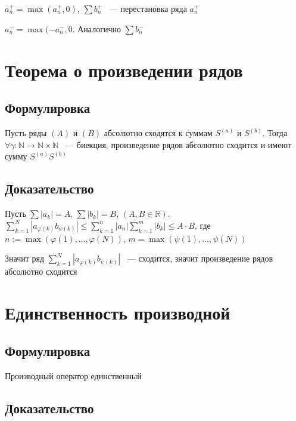 \documentclass{article}
\begin{document}
            $a^+_n = \max(a^+_n, 0)$, $\sum b^+_n$ ~--- перестановка ряда $a^+_n$
            
            $a^-_n = \max(-a^-_n, 0$. Аналогично $\sum b^-_n$
            
    \newpage
    
    \section{Теорема о произведении рядов}
    
        \subsection{Формулировка}
        
            Пусть ряды $(A)$ и $(B)$ абсолютно сходятся к суммам $S^{(a)}$ и $S^{(b)}$. Тогда $\forall \gamma : \mathbb{N} \rightarrow \mathbb{N} \times \mathbb{N}$ ~--- биекция, произведение рядов абсолютно сходится и имеют сумму $S^{(a)} S^{(b)}$
            
        \subsection{Доказательство}
        
            Пусть $\sum |a_k| = A$, $\sum |b_k| = B$, $(A, B \in \mathbb{R})$. $\sum\limits^N_{k = 1} |a_{\varphi(k)} b_{\psi(k)}| \leq \sum\limits^n_{k = 1} |a_n| \sum\limits^m_{k = 1} |b_k| \leq A \cdot B$, где $n := \max(\varphi(1), \ldots, \varphi(N))$, $m = \max(\psi(1), \ldots, \psi(N))$
            
            Значит ряд $\sum\limits^N_{k = 1} |a_{\varphi(k)} b_{\psi(k)}|$ ~--- сходится, значит произведение рядов абсолютно сходится
            
    \newpage
    
    \section{Единственность производной}
    
        \subsection{Формулировка}
        
            Производный оператор единственный
            
        \subsection{Доказательство}
        
\end{document}

